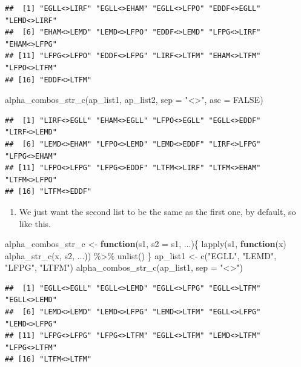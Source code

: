 \documentclass[
]{book}
\newenvironment{Shaded}{\begin{snugshade}}{\end{snugshade}}
\newcommand{\AttributeTok}[1]{\textcolor[rgb]{0.77,0.63,0.00}{#1}}
\newcommand{\ConstantTok}[1]{\textcolor[rgb]{0.00,0.00,0.00}{#1}}
\newcommand{\ControlFlowTok}[1]{\textcolor[rgb]{0.13,0.29,0.53}{\textbf{#1}}}
\newcommand{\FunctionTok}[1]{\textcolor[rgb]{0.00,0.00,0.00}{#1}}
\newcommand{\NormalTok}[1]{#1}
\newcommand{\OtherTok}[1]{\textcolor[rgb]{0.56,0.35,0.01}{#1}}
\newcommand{\SpecialCharTok}[1]{\textcolor[rgb]{0.00,0.00,0.00}{#1}}
\newcommand{\StringTok}[1]{\textcolor[rgb]{0.31,0.60,0.02}{#1}}
\providecommand{\tightlist}{%
  \setlength{\itemsep}{0pt}\setlength{\parskip}{0pt}}
\begin{document}
\begin{verbatim}
##  [1] "EGLL<>LIRF" "EGLL<>EHAM" "EGLL<>LFPO" "EDDF<>EGLL" "LEMD<>LIRF"
##  [6] "EHAM<>LEMD" "LEMD<>LFPO" "EDDF<>LEMD" "LFPG<>LIRF" "EHAM<>LFPG"
## [11] "LFPG<>LFPO" "EDDF<>LFPG" "LIRF<>LTFM" "EHAM<>LTFM" "LFPO<>LTFM"
## [16] "EDDF<>LTFM"
\end{verbatim}

\begin{Shaded}
\begin{Highlighting}[]
\FunctionTok{alpha\_combos\_str\_c}\NormalTok{(ap\_list1, ap\_list2, }\AttributeTok{sep =} \StringTok{"\textless{}\textgreater{}"}\NormalTok{, }\AttributeTok{asc =} \ConstantTok{FALSE}\NormalTok{)}
\end{Highlighting}
\end{Shaded}

\begin{verbatim}
##  [1] "LIRF<>EGLL" "EHAM<>EGLL" "LFPO<>EGLL" "EGLL<>EDDF" "LIRF<>LEMD"
##  [6] "LEMD<>EHAM" "LFPO<>LEMD" "LEMD<>EDDF" "LIRF<>LFPG" "LFPG<>EHAM"
## [11] "LFPO<>LFPG" "LFPG<>EDDF" "LTFM<>LIRF" "LTFM<>EHAM" "LTFM<>LFPO"
## [16] "LTFM<>EDDF"
\end{verbatim}

\begin{enumerate}
\def\labelenumi{\arabic{enumi})}
\setcounter{enumi}{7}
\tightlist
\item
  We just want the second list to be the same as the first one, by default, so like this.
\end{enumerate}

\begin{Shaded}
\begin{Highlighting}[]
\NormalTok{alpha\_combos\_str\_c }\OtherTok{\textless{}{-}} \ControlFlowTok{function}\NormalTok{(s1, }\AttributeTok{s2 =}\NormalTok{ s1, ...)\{}
  \FunctionTok{lapply}\NormalTok{(s1, }\ControlFlowTok{function}\NormalTok{(x) }\FunctionTok{alpha\_str\_c}\NormalTok{(x, s2, ...)) }\SpecialCharTok{\%\textgreater{}\%} 
    \FunctionTok{unlist}\NormalTok{()}
\NormalTok{\}}
\NormalTok{ap\_list1 }\OtherTok{\textless{}{-}} \FunctionTok{c}\NormalTok{(}\StringTok{"EGLL"}\NormalTok{, }\StringTok{"LEMD"}\NormalTok{, }\StringTok{"LFPG"}\NormalTok{, }\StringTok{"LTFM"}\NormalTok{)}
\FunctionTok{alpha\_combos\_str\_c}\NormalTok{(ap\_list1, }\AttributeTok{sep =} \StringTok{"\textless{}\textgreater{}"}\NormalTok{)}
\end{Highlighting}
\end{Shaded}

\begin{verbatim}
##  [1] "EGLL<>EGLL" "EGLL<>LEMD" "EGLL<>LFPG" "EGLL<>LTFM" "EGLL<>LEMD"
##  [6] "LEMD<>LEMD" "LEMD<>LFPG" "LEMD<>LTFM" "EGLL<>LFPG" "LEMD<>LFPG"
## [11] "LFPG<>LFPG" "LFPG<>LTFM" "EGLL<>LTFM" "LEMD<>LTFM" "LFPG<>LTFM"
## [16] "LTFM<>LTFM"
\end{verbatim}
\end{document}
